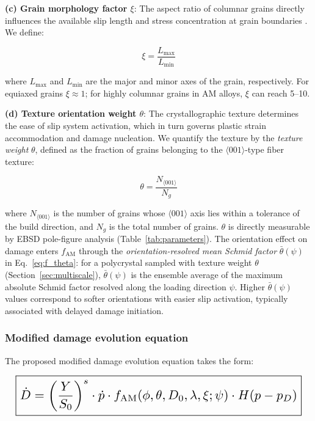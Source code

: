 \documentclass[twocolumn]{sagej}
\begin{document}
\textbf{(c) Grain morphology factor $\xi$}: The aspect ratio of columnar grains directly influences the available slip length and stress concentration at grain boundaries \cite{carroll2015anisotropic}. We define:

\begin{equation}
\xi = \frac{L_{\text{max}}}{L_{\text{min}}}
\label{eq:xi}
\end{equation}

where $L_{\text{max}}$ and $L_{\text{min}}$ are the major and minor axes of the grain, respectively. For equiaxed grains $\xi \approx 1$; for highly columnar grains in AM alloys, $\xi$ can reach 5--10.

\textbf{(d) Texture orientation weight $\theta$}: The crystallographic texture determines the ease of slip system activation, which in turn governs plastic strain accommodation and damage nucleation. We quantify the texture by the \emph{texture weight} $\theta$, defined as the fraction of grains belonging to the $\langle001\rangle$-type fiber texture:

\begin{equation}
\theta = \frac{N_{\langle001\rangle}}{N_g}
\label{eq:theta}
\end{equation}

where $N_{\langle001\rangle}$ is the number of grains whose $\langle001\rangle$ axis lies within a tolerance of the build direction, and $N_g$ is the total number of grains. $\theta$ is directly measurable by EBSD pole-figure analysis (Table~\ref{tab:parameters}). The orientation effect on damage enters $f_{\text{AM}}$ through the \emph{orientation-resolved mean Schmid factor} $\bar{\theta}(\psi)$ in Eq.~\eqref{eq:f_theta}: for a polycrystal sampled with texture weight $\theta$ (Section~\ref{sec:multiscale}), $\bar{\theta}(\psi)$ is the ensemble average of the maximum absolute Schmid factor resolved along the loading direction $\psi$. Higher $\bar{\theta}(\psi)$ values correspond to softer orientations with easier slip activation, typically associated with delayed damage initiation.

\subsubsection{Modified damage evolution equation}

The proposed modified damage evolution equation takes the form:

\begin{equation}
\resizebox{0.97\columnwidth}{!}{$\displaystyle \boxed{\dot{D} = \left(\frac{Y}{S_0}\right)^s \cdot \dot{p} \cdot f_{\text{AM}}(\phi, \theta, D_0, \lambda, \xi; \psi) \cdot H(p - p_D)}$}
\label{eq:modified_evolution}
\end{equation}
\end{document}
